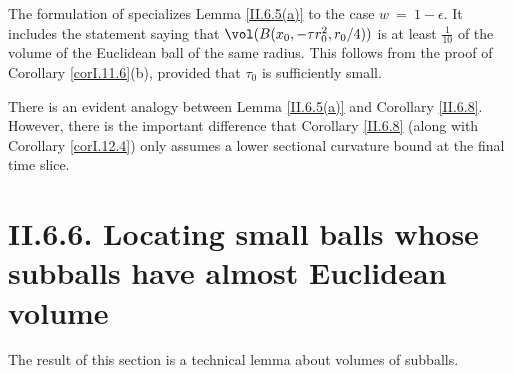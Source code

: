 The formulation of \cite[Lemma II.6.5]{Perelman2} specializes Lemma
\ref{II.6.5(a)} to the case
$w \: = \: 1 - \epsilon$. It includes the statement
\cite[Lemma II.6.5(b)]{Perelman2} saying that $\vol(B(x_0, -\tau
r_0^2, r_0/4))$ is at
least $\frac{1}{10}$ of the volume of the Euclidean ball of the same
radius.  This follows from the proof of Corollary \ref{corI.11.6}(b), provided
that $\tau_0$ is sufficiently small.

There is an evident analogy between Lemma \ref{II.6.5(a)} and
Corollary \ref{II.6.8}. However, there is the important difference that
Corollary \ref{II.6.8} (along with Corollary \ref{corI.12.4}) only
assumes a lower sectional curvature bound at the final time slice.

\section{II.6.6. Locating small balls whose subballs have almost
Euclidean volume}

The result of this section is a technical lemma about volumes
of subballs.

